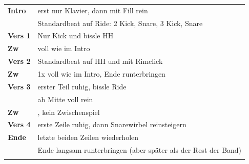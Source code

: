 \begin{tabular}{p{1.6cm}l}
	\textbf{Intro}  & erst nur Klavier, dann mit Fill rein       \\
					& Standardbeat auf Ride: 2 Kick, Snare, 3 Kick, Snare \\
	\textbf{Vers 1} & Nur Kick und bissle HH \\
	\textbf{Zw}     & voll wie im Intro                       \\
	\textbf{Vers 2} & Standardbeat auf HH und mit Rimclick       \\
	\textbf{Zw}     & 1x voll wie im Intro, Ende runterbringen                       \\
	\textbf{Vers 3} & erster Teil ruhig, bissle Ride             \\
					& ab Mitte voll rein                         \\
	\textbf{Zw}     & \highlight{nur 1x hochsteigern}, kein Zwischenspiel       \\
	\textbf{Vers 4} & erste Zeile ruhig, dann Snarewirbel reinsteigern  \\
	\textbf{Ende}   & letzte beiden Zeilen wiederholen           \\
					& Ende langsam runterbringen (aber später als der Rest der Band) \\
	&                                                            \\
\end{tabular}
